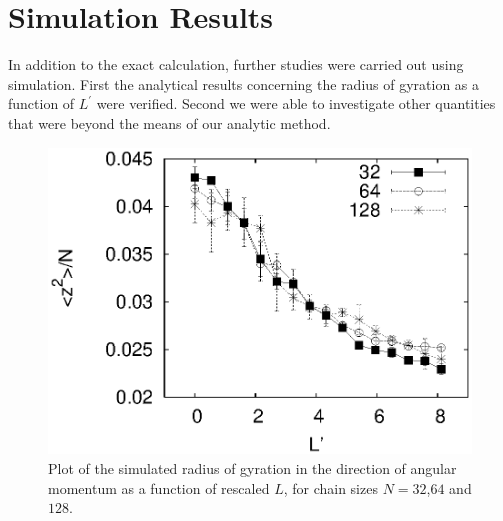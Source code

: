 \documentclass[pre,showpacs]{revtex4}
\begin{document}
\section{Simulation Results}
\label{sec:simresults}
In addition to the exact calculation, further studies were carried out using simulation. First the analytical results concerning the radius of gyration as a function of $L^\prime$ were verified. Second we were able to investigate other quantities that were beyond the means of our analytic method.

\begin{figure}
\begin{center}
\includegraphics[width=\hsize]{zsq}
\caption{Plot of the simulated radius of gyration in the direction of angular momentum as a function of rescaled $L$, for chain sizes $N=32$,$64$ and $128$. }
\label{fig:zsq}
\end{center}
\end{figure}
\end{document}

